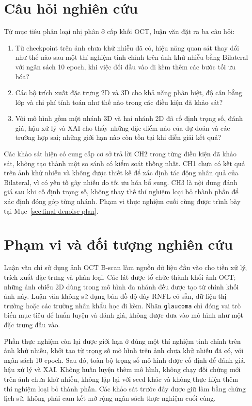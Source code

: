 \documentclass[14pt,a4paper,oneside]{extreport}
\begin{document}
\section{Câu hỏi nghiên cứu}
\label{sec:research-questions}
Từ mục tiêu phân loại nhị phân ở cấp khối OCT, luận văn đặt ra ba câu hỏi:
\begin{enumerate}[label=CH\arabic*.,leftmargin=1.3cm]
 \item Từ checkpoint trên ảnh chưa khử nhiễu đã có, hiệu năng quan sát
 thay đổi như thế nào sau một thí nghiệm tinh chỉnh trên ảnh khử nhiễu
 bằng Bilateral với ngân sách 10 epoch, khi việc đổi đầu vào đi kèm
 thêm các bước tối ưu hóa?
 \item Các bộ trích xuất đặc trưng 2D và 3D cho khả năng phân biệt, độ cân bằng lớp
 và chi phí tính toán như thế nào trong các điều kiện đã khảo sát?
 \item Với mô hình gồm một nhánh 3D và hai nhánh 2D đã cố định trọng số,
 đánh giá, hậu xử lý và XAI cho thấy những đặc điểm nào của dự đoán
 và các trường hợp sai; những giới hạn nào còn tồn tại khi diễn giải kết quả?
\end{enumerate}
Các khảo sát hiện có cung cấp cơ sở trả lời CH2 trong từng điều kiện
đã khảo sát, không tạo thành một so sánh có kiểm soát thống nhất.
CH1 chưa có kết quả trên ảnh khử nhiễu và không được thiết kế để xác
định tác động nhân quả của Bilateral, vì có yếu tố gây nhiễu do tối ưu
hóa bổ sung. CH3 là nội dung đánh giá sau khi cố định trọng số, không
thay thế thí nghiệm loại bỏ thành phần để xác định đóng góp từng nhánh.
Phạm vi thực nghiệm cuối cùng được trình bày tại
Mục~\ref{sec:final-denoise-plan}.

\section{Phạm vi và đối tượng nghiên cứu}
Luận văn chỉ sử dụng ảnh OCT B-scan làm nguồn dữ liệu đầu vào cho
tiền xử lý, trích xuất đặc trưng và phân loại. Các lát được tổ chức
thành khối ảnh OCT; những ảnh chiếu 2D dùng trong mô hình đa nhánh
đều được tạo từ chính khối ảnh này. Luận văn không sử dụng bản đồ độ dày RNFL
có sẵn, dữ liệu thị trường hoặc các trường nhân khẩu học đi kèm.
Nhãn \texttt{glaucoma} chỉ đóng vai trò biến mục tiêu để huấn luyện
và đánh giá, không được đưa vào mô hình như một đặc trưng đầu vào.

Phần thực nghiệm còn lại được giới hạn ở đúng một thí nghiệm tinh chỉnh
trên ảnh khử nhiễu, khởi tạo từ trọng số mô hình trên ảnh chưa khử nhiễu
đã có, với ngân sách 10 epoch. Sau đó, toàn bộ trọng số mô hình được
cố định để đánh giá, hậu xử lý và XAI. Không huấn luyện thêm mô hình,
không chạy đối chứng mới trên ảnh chưa khử nhiễu, không lặp lại với
seed khác và không thực hiện thêm thí nghiệm loại bỏ thành phần.
Các khảo sát trước đây được giữ làm bằng chứng lịch sử, không phải
cam kết mở rộng ngân sách thực nghiệm cuối cùng.
\end{document}
